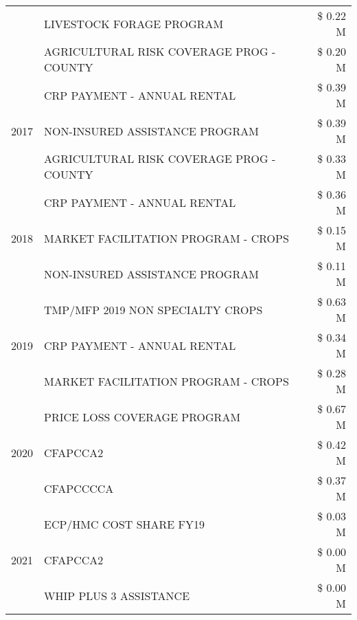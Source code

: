 \begin{tabular}{llr}
 & LIVESTOCK FORAGE PROGRAM & \$ 0.22 M \\
 & AGRICULTURAL RISK COVERAGE PROG - COUNTY & \$ 0.20 M \\
\cline{1-3}
\multirow[t]{3}{*}{2017} & CRP PAYMENT - ANNUAL RENTAL & \$ 0.39 M \\
 & NON-INSURED ASSISTANCE PROGRAM & \$ 0.39 M \\
 & AGRICULTURAL RISK COVERAGE PROG - COUNTY & \$ 0.33 M \\
\cline{1-3}
\multirow[t]{3}{*}{2018} & CRP PAYMENT - ANNUAL RENTAL & \$ 0.36 M \\
 & MARKET FACILITATION PROGRAM - CROPS & \$ 0.15 M \\
 & NON-INSURED ASSISTANCE PROGRAM & \$ 0.11 M \\
\cline{1-3}
\multirow[t]{3}{*}{2019} & TMP/MFP 2019 NON SPECIALTY CROPS & \$ 0.63 M \\
 & CRP PAYMENT - ANNUAL RENTAL & \$ 0.34 M \\
 & MARKET FACILITATION PROGRAM - CROPS & \$ 0.28 M \\
\cline{1-3}
\multirow[t]{3}{*}{2020} & PRICE LOSS COVERAGE PROGRAM & \$ 0.67 M \\
 & CFAPCCA2 & \$ 0.42 M \\
 & CFAPCCCCA & \$ 0.37 M \\
\cline{1-3}
\multirow[t]{3}{*}{2021} & ECP/HMC COST SHARE FY19 & \$ 0.03 M \\
 & CFAPCCA2 & \$ 0.00 M \\
 & WHIP PLUS 3 ASSISTANCE & \$ 0.00 M \\
\cline{1-3}
\bottomrule
\end{tabular}
